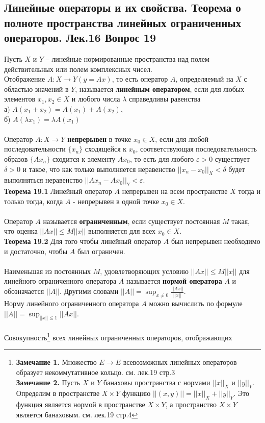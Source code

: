 \documentclass{article}
\begin{document}
\subsection{Линейные операторы и их свойства. Теорема о полноте пространства линейных ограниченных операторов. Лек.16 \textbf{Вопрос 19}}
	Пусть $X$ и $Y$ – линейные нормированные пространства над полем действительных или полем комплексных чисел.\\
	Отображение $A:X\rightarrow Y (y = Ax)$, то есть оператор $A$,
	определяемый на $X$ с областью значений в $Y$, называется \textbf{линейным оператором}, если для любых элементов ${x}_{1},{x}_{2}\in X$ и любого числа $\lambda$ справедливы равенства\\
	а) $A({x}_{1}+{x}_{2}) = A({x}_{1})+A({x}_{2})$,\\
	б) $A(\lambda {x}_{1}) = \lambda A({x}_{1})$\\
	\\
	Оператор $A:X\rightarrow Y$ \textbf{непрерывен} в точке ${x}_{0}\in X$, если для любой последовательности $\{{x}_{n}\}$ сходящейся к ${x}_{0}$, соответствующая последовательность образов $\{{Ax}_{n}\}$ сходится к элементу ${Ax}_{0}$, то есть для любого $\varepsilon>0$ существует $\delta>0$ и такое, что как только выполняется неравенство ${||{x}_{n}-{x}_{0}||}_{X}<\delta$ будет выполняться неравенство ${||{Ax}_{n}-{Ax}_{0}||}_{Y}<\varepsilon$.\\
	\textbf{Теорема 19.1} Линейный оператор $A$ непрерывен на всем пространстве $X$ тогда и только тогда, когда $A$ - непрерывен в одной точке ${x}_{0}\in X$.\\
	\\
	Оператор $A$ называется \textbf{ограниченным}, если существует постоянная $M$ такая, что оценка $||Ax||\le M||x||$ выполняется для всех ${x}_{0}\in X$.\\
	\textbf{Теорема 19.2} Для того чтобы линейный оператор $A$ был непрерывен необходимо и достаточно, чтобы $A$ был ограничен.\\
	\\
	Наименьшая из постоянных $M$, удовлетворяющих
	условию $||Ax||\le M||x||$ для линейного ограниченного оператора $A$ называется \textbf{нормой оператора} $A$ и обозначается $||A||$. Другими словами $||A||=\sup_{x\ne 0} \frac{||Ax||}{||x||}$.\\
	Норму линейного ограниченного оператора $A$ можно вычислить по формуле $||A||=\sup_{||x||\le 1} ||Ax||$.\\
	\\
	Совокупность\footnote{\textbf{Замечание 1.} Множество $E\rightarrow E$ всевозможных линейных операторов образует некоммутативное кольцо. см. лек.19 стр.3\\
	\textbf{Замечание 2.} Пусть $X$ и $Y$ банаховы пространства с нормами ${||x||}_{X}$ и ${||y||}_{Y}$. Определим в пространстве $X\times Y$ функцию $||(x,y)||={||x||}_{X}+{||y||}_{Y}$. Это функция является нормой в пространстве $X\times Y$, а пространство $X\times Y$ является банаховым. см. лек.19 стр.4} всех линейных ограниченных операторов, отображающих
\end{document}
